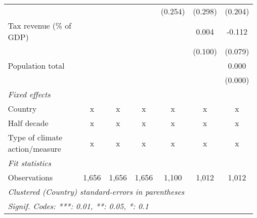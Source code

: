 \begin{tabular}{lcccccc}
                                                                  &             &         &                & (0.254)     & (0.298) & (0.204)\\   
   Tax revenue (\% of GDP)                                        &             &         &                &             & 0.004   & -0.112\\   
                                                                  &             &         &                &             & (0.100) & (0.079)\\   
   Population total                                               &             &         &                &             &         & 0.000\\   
                                                                  &             &         &                &             &         & (0.000)\\   
   \emph{Fixed effects}\\
   Country                                                        & x           & x       & x              & x           & x       & x\\  
   Half decade                                                    & x           & x       & x              & x           & x       & x\\  
   Type of climate action/measure                                 & x           & x       & x              & x           & x       & x\\  
   \midrule \emph{Fit statistics}\\
   Observations                                                   & 1,656       & 1,656   & 1,656          & 1,100       & 1,012   & 1,012\\  
   \midrule
   \multicolumn{7}{l}{\emph{Clustered (Country) standard-errors in parentheses}}\\
   \multicolumn{7}{l}{\emph{Signif. Codes: ***: 0.01, **: 0.05, *: 0.1}}\\
\end{tabular}
\par\endgroup


